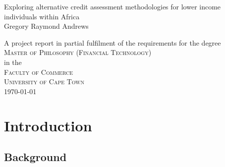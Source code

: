 \documentclass[a4paper,11pt,fleqn]{report}
\begin{document}
	
\thispagestyle{empty}


\begin{center}
	{\huge Exploring alternative credit assessment methodologies for lower income individuals within Africa}
	\vspace{20mm} \\
	{\Large Gregory Raymond Andrews}
	\vfill
	
	A project report in partial fulfilment of the requirements for the degree \\
	\vspace{10mm}
	{\Large \textsc{Master of Philosophy (Financial Technology)}} \\
	\vfill
	in the \\
	\vspace{20mm}
	{\Large \textsc{Faculty of Commerce}}\\
	\vspace{10mm}
	{\Large\textsc{University of Cape Town}} \\
	\vfill
	\today
\end{center}



\tableofcontents
\listoffigures
\listoftables



\chapter{Introduction}
\setcounter{page}{1}
\acresetall



\section{Background}
\end{document}
